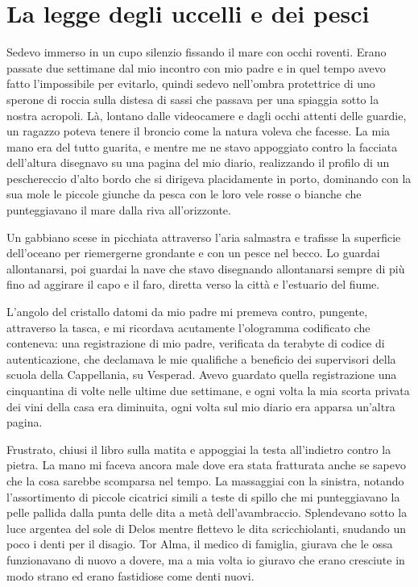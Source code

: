 \chapter{La legge degli uccelli e dei pesci}

Sedevo immerso in un cupo silenzio fissando il mare con occhi roventi.
Erano passate due settimane dal mio incontro con mio padre e in quel
tempo avevo fatto l'impossibile per evitarlo, quindi sedevo nell'ombra
protettrice di uno sperone di roccia sulla distesa di sassi che passava
per una spiaggia sotto la nostra acropoli. Là, lontano dalle videocamere
e dagli occhi attenti delle guardie, un ragazzo poteva tenere il broncio
come la natura voleva che facesse. La mia mano era del tutto guarita, e
mentre me ne stavo appoggiato contro la facciata dell'altura disegnavo
su una pagina del mio diario, realizzando il profilo di un peschereccio
d'alto bordo che si dirigeva placidamente in porto, dominando con la sua
mole le piccole giunche da pesca con le loro vele rosse o bianche che
punteggiavano il mare dalla riva all'orizzonte.

Un gabbiano scese in picchiata attraverso l'aria salmastra e trafisse la
superficie dell'oceano per riemergerne grondante e con un pesce nel
becco. Lo guardai allontanarsi, poi guardai la nave che stavo disegnando
allontanarsi sempre di più fino ad aggirare il capo e il faro, diretta
verso la città e l'estuario del fiume.

L'angolo del cristallo datomi da mio padre mi premeva contro, pungente,
attraverso la tasca, e mi ricordava acutamente l'ologramma codificato
che conteneva: una registrazione di mio padre, verificata da terabyte di
codice di autenticazione, che declamava le mie qualifiche a beneficio
dei supervisori della scuola della Cappellania, su Vesperad. Avevo
guardato quella registrazione una cinquantina di volte nelle ultime due
settimane, e ogni volta la mia scorta privata dei vini della casa era
diminuita, ogni volta sul mio diario era apparsa un'altra pagina.

Frustrato, chiusi il libro sulla matita e appoggiai la testa
all'indietro contro la pietra. La mano mi faceva ancora male dove era
stata fratturata anche se sapevo che la cosa sarebbe scomparsa nel
tempo. La massaggiai con la sinistra, notando l'assortimento di piccole
cicatrici simili a teste di spillo che mi punteggiavano la pelle pallida
dalla punta delle dita a metà dell'avambraccio. Splendevano sotto la
luce argentea del sole di Delos mentre flettevo le dita scricchiolanti,
snudando un poco i denti per il disagio. Tor Alma, il medico di
famiglia, giurava che le ossa funzionavano di nuovo a dovere, ma a mia
volta io giuravo che erano cresciute in modo strano ed erano fastidiose
come denti nuovi.

